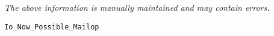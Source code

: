 \label{pkg:io\_now\_possible\_mailop}

{\tiny \it The above information is manually maintained and may contain errors.}
\begin{verbatim}
Io_Now_Possible_Mailop
\end{verbatim}
